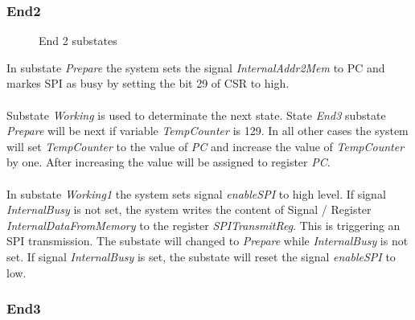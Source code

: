 \subsubsection{End2} 
\begin{figure}[htb] 
\begin{center}
\end{center}
\caption{End 2 substates}
\end{figure}
\noindent
In substate \textit{Prepare} the system sets the signal \textit{InternalAddr2Mem} to PC and markes SPI as busy by setting the bit 29 of CSR to high. \\\\
Substate \textit{Working} is used to determinate the next state. State \textit{End3} substate \textit{Prepare} will be next if variable \textit{TempCounter} is 129. In all other cases the system will set \textit{TempCounter} to the value of \textit{PC} and increase the value of \textit{TempCounter} by one. After increasing the value will be assigned to register \textit{PC}. \\\\
In substate \textit{Working1} the system sets signal \textit{enableSPI} to high level. If signal \textit{InternalBusy} is not set, the system
writes the content of Signal / Register \textit{InternalDataFromMemory} to the register \textit{SPITransmitReg}. This is triggering an SPI transmission. The substate will changed to \textit{Prepare} while \textit{InternalBusy} is not set. If signal \textit{InternalBusy} is set, the substate will reset the signal \textit{enableSPI} to low. 

\subsubsection{End3}















